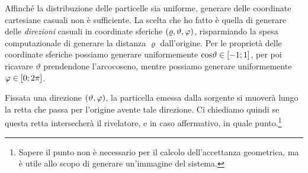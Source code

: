             Affinché la distribuzione delle particelle sia uniforme, generare delle coordinate cartesiane casuali non è sufficiente. La scelta che ho fatto è quella di generare delle \emph{direzioni} casuali in coordinate sferiche $\pqty{\varrho,\vartheta,\varphi}$, risparmiando la spesa computazionale di generare la distanza $\varrho$ dall'origine. Per le proprietà delle coordinate sferiche possiamo generare uniformemente $\cos\!\vartheta\in\bqty{-1;1}$, per poi ricavare $\vartheta$ prendendone l'arcocoseno, mentre possiamo generare uniformemente $\varphi\in\bqty{0;2\pi}$.

            Fissata una direzione $\pqty{\vartheta,\varphi}$, la particella emessa dalla sorgente si muoverà lungo la retta che passa per l'origine avente tale direzione. Ci chiediamo quindi se questa retta intersecherà il rivelatore, e in caso affermativo, in quale punto.\footnote{Sapere il punto non è necessario per il calcolo dell'accettanza geometrica, ma è utile allo scopo di generare un'immagine del sistema.}

